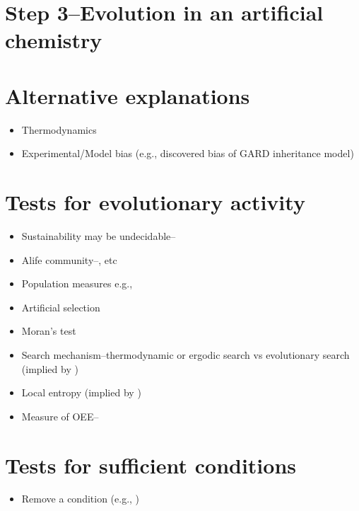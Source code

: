 \section{Step 3--Evolution in an artificial chemistry}\label{step-3 -- evolution-in-an-artificial-chemistry}

\section{Alternative explanations}\label{alternative-explanations}

\begin{itemize}
	\item
 Thermodynamics
	\item
 Experimental/Model bias (e.g., discovered bias of GARD inheritance
 model)
\end{itemize}

\section{Tests for evolutionary activity}\label{tests-for-evolutionary-activity}

\begin{itemize}
	\item
 Sustainability may be undecidable--\autocite{Wiedermann:2005ys}
	\item
 Alife community--\autocite{Channon:2006st}, etc
	\item
 Population measures e.g., \autocite{Vasas2015}
	\item
 Artificial selection
	\item
 Moran's test
	\item
 Search mechanism--thermodynamic or ergodic search vs evolutionary
 search (implied by \autocite{Rasmussen2004})
	\item
 Local entropy (implied by \autocite{Adami2015})
	\item
 Measure of OEE--\autocite{Markovitch2012}
\end{itemize}

\section{Tests for sufficient conditions}\label{tests-for-sufficient-conditions}

\begin{itemize}
	\item
 Remove a condition (e.g., \autocite{Soros2014})
\end{itemize}
